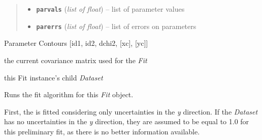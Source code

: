 \documentclass[a4paper,10pt,english]{sphinxmanual}
\begin{document}
\begin{fulllineitems}
\begin{fulllineitems}
\begin{quote}
\begin{description}
\begin{itemize}
\item {} 
\textbf{\texttt{parvals}} (\emph{list of float}) -- list of parameter values

\item {} 
\textbf{\texttt{parerrs}} (\emph{list of float}) -- list of errors on parameters

\end{itemize}

\end{description}\end{quote}

\end{fulllineitems}


\begin{fulllineitems}
\label{module_doc:kafe.fit.Fit.contours}
Parameter Contours {[}id1, id2, dchi2, {[}xc{]}, {[}yc{]}{]}

\end{fulllineitems}


\begin{fulllineitems}
\label{module_doc:kafe.fit.Fit.current_cov_mat}
the current covariance matrix used for the \emph{Fit}

\end{fulllineitems}


\begin{fulllineitems}
\label{module_doc:kafe.fit.Fit.dataset}
this Fit instance's child \emph{Dataset}

\end{fulllineitems}


\begin{fulllineitems}
\label{module_doc:kafe.fit.Fit.do_fit}
Runs the fit algorithm for this \emph{Fit} object.

First, the  is fitted considering only uncertainties
in the
\emph{y} direction. If the \emph{Dataset} has no uncertainties in the \emph{y}
direction, they are assumed to be equal to 1.0 for this preliminary
fit, as there is no better information available.


\end{fulllineitems}
\end{fulllineitems}
\end{document}
